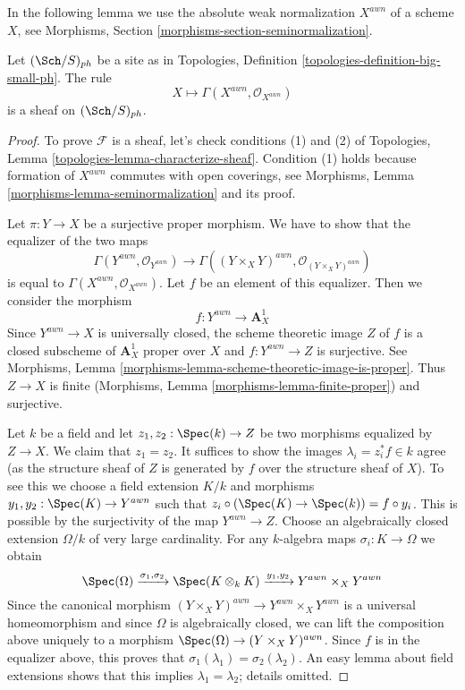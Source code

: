 \noindent
In the following lemma we use the absolute weak normalization $X^{awn}$
of a scheme $X$, see
Morphisms, Section \ref{morphisms-section-seminormalization}.

\begin{lemma}
\label{lemma-weak-normalization-ph-sheaf}
Let $(\Sch/S)_{ph}$ be a site as in
Topologies, Definition \ref{topologies-definition-big-small-ph}.
The rule
$$
X \longmapsto \Gamma(X^{awn}, \mathcal{O}_{X^{awn}})
$$
is a sheaf on $(\Sch/S)_{ph}$.
\end{lemma}

\begin{proof}
To prove $\mathcal{F}$ is a sheaf, let's check conditions
(1) and (2) of Topologies, Lemma \ref{topologies-lemma-characterize-sheaf}.
Condition (1) holds because formation of $X^{awn}$ commutes with
open coverings, see Morphisms, Lemma \ref{morphisms-lemma-seminormalization}
and its proof.

\medskip\noindent
Let $\pi : Y \to X$ be a surjective proper morphism. We have to show
that the equalizer of the two maps
$$
\Gamma(Y^{awn}, \mathcal{O}_{Y^{awn}}) \to
\Gamma((Y \times_X Y)^{awn}, \mathcal{O}_{(Y \times_X Y)^{awn}})
$$
is equal to $\Gamma(X^{awn}, \mathcal{O}_{X^{awn}})$. Let $f$ be
an element of this equalizer. Then we consider the morphism
$$
f : Y^{awn} \longrightarrow \mathbf{A}^1_X
$$
Since $Y^{awn} \to X$ is universally closed, the scheme theoretic
image $Z$ of $f$ is a closed subscheme of $\mathbf{A}^1_X$ proper over $X$
and $f : Y^{awn} \to Z$ is surjective.
See Morphisms, Lemma \ref{morphisms-lemma-scheme-theoretic-image-is-proper}.
Thus $Z \to X$ is finite
(Morphisms, Lemma \ref{morphisms-lemma-finite-proper})
and surjective.

\medskip\noindent
Let $k$ be a field and let $z_1, z_2 : \Spec(k) \to Z$ be two
morphisms equalized by $Z \to X$. We claim that $z_1 = z_2$.
It suffices to show the images $\lambda_i = z_i^*f \in k$ agree
(as the structure sheaf of $Z$ is generated by $f$
over the structure sheaf of $X$). To see this we
choose a field extension
$K/k$ and morphisms $y_1, y_2 : \Spec(K) \to Y^{awn}$ such that
$z_i \circ (\Spec(K) \to \Spec(k)) = f \circ y_i$. This is possible
by the surjectivity of the map $Y^{awn} \to Z$. Choose an algebraically
closed extension $\Omega/k$ of very large cardinality.
For any $k$-algebra maps $\sigma_i : K \to \Omega$
we obtain
$$
\Spec(\Omega)
\xrightarrow{\sigma_1, \sigma_2}
\Spec(K \otimes_k K)
\xrightarrow{y_1, y_2}
Y^{awn} \times_X Y^{awn}
$$
Since the canonical morphism
$(Y \times_X Y)^{awn} \to Y^{awn} \times_X Y^{awn}$
is a universal homeomorphism and since $\Omega$ is algebraically closed,
we can lift the composition above uniquely to a morphism
$\Spec(\Omega) \to (Y \times_X Y)^{awn}$. Since $f$ is in the equalizer
above, this proves that $\sigma_1(\lambda_1) = \sigma_2(\lambda_2)$.
An easy lemma about field extensions shows that this implies
$\lambda_1 = \lambda_2$; details omitted.


\end{proof}
